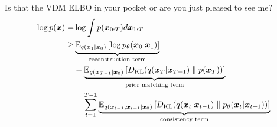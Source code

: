 \begin{frame}{Is that the VDM ELBO in your pocket or are you just pleased to see me?}
    \vspace{-1.4em}
    \begin{align*}
        \log p(\boldsymbol{x}) = & \log\int p(\boldsymbol{x}_{0:T})d \boldsymbol{x}_{1:T}                                                                                                                                                                \\
        \ge           & \underbrace{\mathbb{E}_{q(\boldsymbol{x}_{1}|\boldsymbol{x}_{0})}\left[\log p_{\theta}(\boldsymbol{x}_{0}|\boldsymbol{x}_{1})\right]}_{\textrm{reconstruction term}}                                                                        \\
                      & - \underbrace{\mathbb{E}_{q(\boldsymbol{x}_{T-1}|\boldsymbol{x}_{0})}\left[D_{\mathrm{KL}}(q(\boldsymbol{x}_{T}|\boldsymbol{x}_{T-1}) \parallel p(\boldsymbol{x}_{T}))\right]}_{\textrm{prior matching term}}                                          \\
                      & -\sum_{t=1}^{T-1}\underbrace{\mathbb{E}_{q(\boldsymbol{x}_{t-1},\boldsymbol{x}_{t+1}|\boldsymbol{x}_{0})}\left[D_{\mathrm{KL}}(q(\boldsymbol{x}_{t}|\boldsymbol{x}_{t-1}) \parallel p_{\theta}(\boldsymbol{x}_{t}|\boldsymbol{x}_{t+1}))\right]}_{\textrm{consistency term}} \\
    \end{align*}
\end{frame}